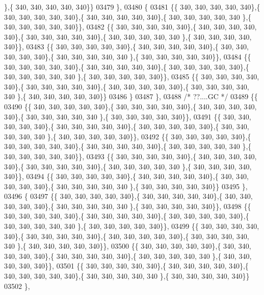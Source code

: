 \begin{DoxyCode}
      \},\{ 340, 340, 340, 340, 340\}\}
03479 \},
03480 \{
03481 \{\{ 340, 340, 340, 340, 340\},\{ 340, 340, 340, 340, 340\},\{ 340, 340, 340, 340, 340\},\{ 340, 340, 340, 340, 340
      \},\{ 340, 340, 340, 340, 340\}\},
03482 \{\{ 340, 340, 340, 340, 340\},\{ 340, 340, 340, 340, 340\},\{ 340, 340, 340, 340, 340\},\{ 340, 340, 340, 340, 340
      \},\{ 340, 340, 340, 340, 340\}\},
03483 \{\{ 340, 340, 340, 340, 340\},\{ 340, 340, 340, 340, 340\},\{ 340, 340, 340, 340, 340\},\{ 340, 340, 340, 340, 340
      \},\{ 340, 340, 340, 340, 340\}\},
03484 \{\{ 340, 340, 340, 340, 340\},\{ 340, 340, 340, 340, 340\},\{ 340, 340, 340, 340, 340\},\{ 340, 340, 340, 340, 340
      \},\{ 340, 340, 340, 340, 340\}\},
03485 \{\{ 340, 340, 340, 340, 340\},\{ 340, 340, 340, 340, 340\},\{ 340, 340, 340, 340, 340\},\{ 340, 340, 340, 340, 340
      \},\{ 340, 340, 340, 340, 340\}\}
03486 \}
03487 \},
03488 \textcolor{comment}{/* ??....GC */}
03489 \{\{
03490 \{\{ 340, 340, 340, 340, 340\},\{ 340, 340, 340, 340, 340\},\{ 340, 340, 340, 340, 340\},\{ 340, 340, 340, 340, 340
      \},\{ 340, 340, 340, 340, 340\}\},
03491 \{\{ 340, 340, 340, 340, 340\},\{ 340, 340, 340, 340, 340\},\{ 340, 340, 340, 340, 340\},\{ 340, 340, 340, 340, 340
      \},\{ 340, 340, 340, 340, 340\}\},
03492 \{\{ 340, 340, 340, 340, 340\},\{ 340, 340, 340, 340, 340\},\{ 340, 340, 340, 340, 340\},\{ 340, 340, 340, 340, 340
      \},\{ 340, 340, 340, 340, 340\}\},
03493 \{\{ 340, 340, 340, 340, 340\},\{ 340, 340, 340, 340, 340\},\{ 340, 340, 340, 340, 340\},\{ 340, 340, 340, 340, 340
      \},\{ 340, 340, 340, 340, 340\}\},
03494 \{\{ 340, 340, 340, 340, 340\},\{ 340, 340, 340, 340, 340\},\{ 340, 340, 340, 340, 340\},\{ 340, 340, 340, 340, 340
      \},\{ 340, 340, 340, 340, 340\}\}
03495 \},
03496 \{
03497 \{\{ 340, 340, 340, 340, 340\},\{ 340, 340, 340, 340, 340\},\{ 340, 340, 340, 340, 340\},\{ 340, 340, 340, 340, 340
      \},\{ 340, 340, 340, 340, 340\}\},
03498 \{\{ 340, 340, 340, 340, 340\},\{ 340, 340, 340, 340, 340\},\{ 340, 340, 340, 340, 340\},\{ 340, 340, 340, 340, 340
      \},\{ 340, 340, 340, 340, 340\}\},
03499 \{\{ 340, 340, 340, 340, 340\},\{ 340, 340, 340, 340, 340\},\{ 340, 340, 340, 340, 340\},\{ 340, 340, 340, 340, 340
      \},\{ 340, 340, 340, 340, 340\}\},
03500 \{\{ 340, 340, 340, 340, 340\},\{ 340, 340, 340, 340, 340\},\{ 340, 340, 340, 340, 340\},\{ 340, 340, 340, 340, 340
      \},\{ 340, 340, 340, 340, 340\}\},
03501 \{\{ 340, 340, 340, 340, 340\},\{ 340, 340, 340, 340, 340\},\{ 340, 340, 340, 340, 340\},\{ 340, 340, 340, 340, 340
      \},\{ 340, 340, 340, 340, 340\}\}
03502 \},

\end{DoxyCode}
